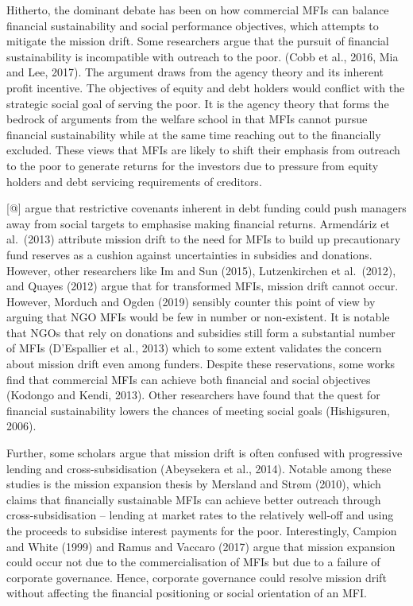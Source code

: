 \documentclass[
]{article}
\begin{document}
Hitherto, the dominant debate has been on how commercial MFIs can
balance financial sustainability and social performance objectives,
which attempts to mitigate the mission drift. Some researchers argue
that the pursuit of financial sustainability is incompatible with
outreach to the poor. (Cobb et al., 2016, Mia and Lee, 2017). The
argument draws from the agency theory and its inherent profit incentive.
The objectives of equity and debt holders would conflict with the
strategic social goal of serving the poor. It is the agency theory that
forms the bedrock of arguments from the welfare school in that MFIs
cannot pursue financial sustainability while at the same time reaching
out to the financially excluded. These views that MFIs are likely to
shift their emphasis from outreach to the poor to generate returns for
the investors due to pressure from equity holders and debt servicing
requirements of creditors.

{[}@{]} argue that restrictive covenants inherent in debt funding could
push managers away from social targets to emphasise making financial
returns. Armendáriz et al.~(2013) attribute mission drift to the need
for MFIs to build up precautionary fund reserves as a cushion against
uncertainties in subsidies and donations. However, other researchers
like Im and Sun (2015), Lutzenkirchen et al.~(2012), and Quayes (2012)
argue that for transformed MFIs, mission drift cannot occur. However,
Morduch and Ogden (2019) sensibly counter this point of view by arguing
that NGO MFIs would be few in number or non-existent. It is notable that
NGOs that rely on donations and subsidies still form a substantial
number of MFIs (D'Espallier et al., 2013) which to some extent validates
the concern about mission drift even among funders. Despite these
reservations, some works find that commercial MFIs can achieve both
financial and social objectives (Kodongo and Kendi, 2013). Other
researchers have found that the quest for financial sustainability
lowers the chances of meeting social goals (Hishigsuren, 2006).

Further, some scholars argue that mission drift is often confused with
progressive lending and cross-subsidisation (Abeysekera et al., 2014).
Notable among these studies is the mission expansion thesis by Mersland
and Strøm (2010), which claims that financially sustainable MFIs can
achieve better outreach through cross-subsidisation -- lending at market
rates to the relatively well-off and using the proceeds to subsidise
interest payments for the poor. Interestingly, Campion and White (1999)
and Ramus and Vaccaro (2017) argue that mission expansion could occur
not due to the commercialisation of MFIs but due to a failure of
corporate governance. Hence, corporate governance could resolve mission
drift without affecting the financial positioning or social orientation
of an MFI.
\end{document}
